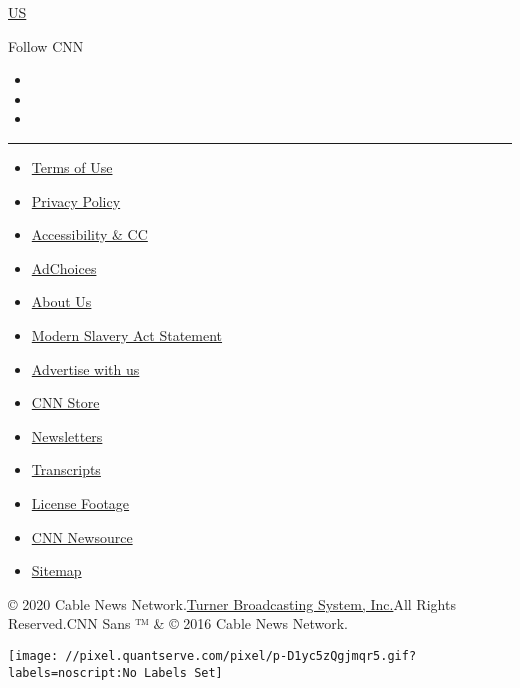 \href{/us}{US}

Follow CNN

\begin{itemize}
\item
\item
\item
\end{itemize}

\begin{center}\rule{0.5\linewidth}{\linethickness}\end{center}

\begin{itemize}
\tightlist
\item
  \href{/terms}{Terms of Use}
\item
  \href{/privacy}{Privacy Policy}
\item
  \href{/accessibility}{Accessibility \& CC}
\item
  \protect\hyperlink{}{AdChoices}
\item
  \href{/about}{About Us}
\item
  \href{/msa}{Modern Slavery Act Statement}
\item
  \href{https://commercial.cnn.com}{Advertise with us}
\item
  \href{//store.cnn.com}{CNN Store}
\item
  \href{/newsletters}{Newsletters}
\item
  \href{/transcripts}{Transcripts}
\item
  \href{/collection}{License Footage}
\item
  \href{http://cnnnewsource.com}{CNN Newsource}
\item
  \href{https://www.cnn.com/sitemap.html}{Sitemap}
\end{itemize}

© 2020 Cable News Network.\href{//www.turner.com}{Turner Broadcasting
System, Inc.}All Rights Reserved.CNN Sans ™ \& © 2016 Cable News
Network.

\texttt{[image: //pixel.quantserve.com/pixel/p-D1yc5zQgjmqr5.gif?labels=noscript:No Labels Set]}
